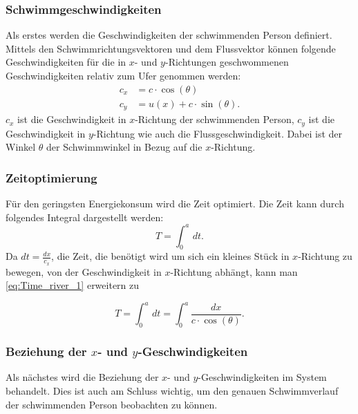 \subsubsection{Schwimmgeschwindigkeiten}
%
Als erstes werden die Geschwindigkeiten der schwimmenden Person
definiert. Mittels den Schwimmrichtungsvektoren und dem Flussvektor
können folgende Geschwindigkeiten für die in \(x\)- und \(y\)-Richtungen
geschwommenen Geschwindigkeiten relativ zum Ufer genommen werden:
\begin{align*}
    c_x &= c\cdot \cos(\theta)
\label{eq:c_x_equation}
\\
    c_y &= u(x) + c \cdot \sin(\theta).
\end{align*}
\(c_x\) ist die Geschwindigkeit in \(x\)-Richtung der schwimmenden
Person, \(c_y\) ist die Geschwindigkeit in \(y\)-Richtung wie auch
die Flussgeschwindigkeit. Dabei ist der Winkel \(\theta\) der
Schwimmwinkel in Bezug auf die \(x\)-Richtung.


\subsubsection{Zeitoptimierung}

Für den geringsten Energiekonsum wird die Zeit optimiert. Die Zeit
kann durch folgendes Integral dargestellt werden:
\begin{equation}
    T = \int_0^a\,dt \label{eq:Time_river_1}.
\end{equation}
Da \(dt = \frac{dx}{c_x}\), die Zeit, die benötigt wird um sich ein
kleines Stück in \(x\)-Richtung zu bewegen, von der Geschwindigkeit
in \(x\)-Richtung abhängt, kann man \eqref{eq:Time_river_1} erweitern
zu

\begin{equation*}
    T = \int_0^a\,dt = \int_0^a\frac{dx}{c\cdot \cos(\theta)}.
\end{equation*} 


\subsubsection{Beziehung der \(x\)- und \(y\)-Geschwindigkeiten}

Als nächstes wird die Beziehung der \(x\)- und \(y\)-Geschwindigkeiten
im System behandelt. Dies ist auch am Schluss wichtig, um den genauen
Schwimmverlauf der schwimmenden Person beobachten zu können.

